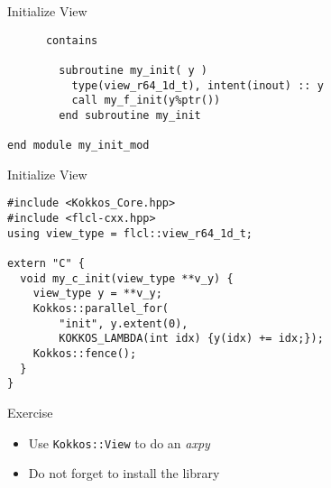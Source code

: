 \begin{frame}[containsverbatim]{Initialize View}
  \begin{verbatim}
      contains

        subroutine my_init( y )
          type(view_r64_1d_t), intent(inout) :: y
          call my_f_init(y%ptr())
        end subroutine my_init
  
end module my_init_mod
  \end{verbatim}
\end{frame}

\begin{frame}[containsverbatim]{Initialize View}
  \begin{verbatim}
#include <Kokkos_Core.hpp>
#include <flcl-cxx.hpp>
using view_type = flcl::view_r64_1d_t;

extern "C" {
  void my_c_init(view_type **v_y) {
    view_type y = **v_y;
    Kokkos::parallel_for(
        "init", y.extent(0), 
        KOKKOS_LAMBDA(int idx) {y(idx) += idx;});
    Kokkos::fence();
  }
}
  \end{verbatim}
\end{frame}

\begin{frame}{Exercise}
  \begin{itemize}
    \item Use \texttt{Kokkos::View} to do an \emph{axpy}
    \item Do not forget to install the library
  \end{itemize}
\end{frame}


